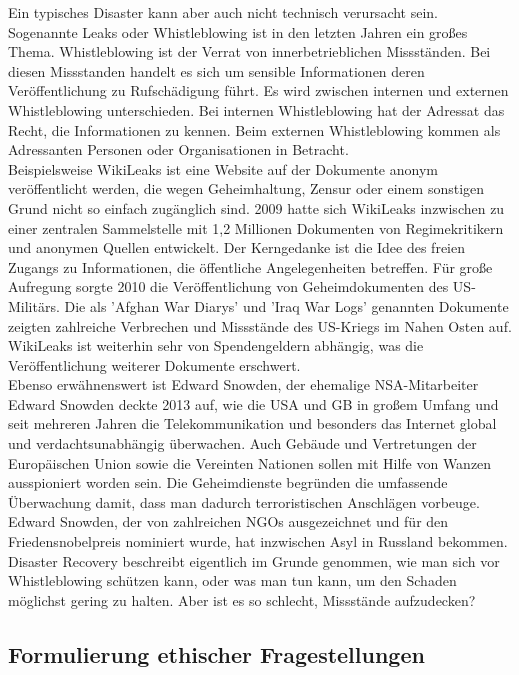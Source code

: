 \documentclass[letterpaper, 12pt]{article}
\let\tempsubsection\subsection
\renewcommand\subsection[1]{\vspace{0cm}\tempsubsection{#1}\vspace{0cm}}
\begin{document}
Ein typisches Disaster kann aber auch nicht technisch verursacht sein. Sogenannte Leaks oder Whistleblowing ist in den letzten Jahren ein großes Thema. Whistleblowing ist der Verrat von innerbetrieblichen Missständen. Bei diesen Missstanden handelt es sich um sensible Informationen deren Veröffentlichung zu Rufschädigung führt. Es wird zwischen internen und externen Whistleblowing unterschieden. Bei internen Whistleblowing hat der Adressat das Recht, die Informationen zu kennen. Beim externen Whistleblowing kommen als Adressanten Personen oder Organisationen in Betracht. \\
Beispielsweise WikiLeaks ist eine Website auf der Dokumente anonym veröffentlicht werden, die wegen Geheimhaltung, Zensur oder einem sonstigen Grund nicht so einfach zugänglich sind. 2009 hatte sich WikiLeaks inzwischen zu einer zentralen Sammelstelle mit 1,2 Millionen Dokumenten von Regimekritikern und anonymen Quellen entwickelt. Der Kerngedanke ist die Idee des freien Zugangs zu Informationen, die öffentliche Angelegenheiten betreffen.
Für große Aufregung sorgte 2010 die Veröffentlichung von Geheimdokumenten des US-Militärs. Die als 'Afghan War Diarys' und 'Iraq War Logs' genannten Dokumente zeigten zahlreiche Verbrechen und Missstände des US-Kriegs im Nahen Osten auf. WikiLeaks ist weiterhin sehr von Spendengeldern abhängig, was die Veröffentlichung weiterer Dokumente erschwert. \\
Ebenso erwähnenswert ist Edward Snowden, der ehemalige NSA-Mitarbeiter Edward Snowden deckte 2013 auf, wie die USA und GB in großem Umfang und seit mehreren Jahren die Telekommunikation und besonders das Internet global und verdachtsunabhängig überwachen. Auch Gebäude und Vertretungen der Europäischen Union sowie die Vereinten Nationen sollen mit Hilfe von Wanzen ausspioniert worden sein. Die Geheimdienste begründen die umfassende Überwachung damit, dass man dadurch terroristischen Anschlägen vorbeuge.
Edward Snowden, der von zahlreichen NGOs ausgezeichnet und für den Friedensnobelpreis nominiert wurde, hat inzwischen Asyl in Russland bekommen. \\
Disaster Recovery beschreibt eigentlich im Grunde genommen, wie man sich vor Whistleblowing schützen kann, oder was man tun kann, um den Schaden möglichst gering zu halten. Aber ist es so schlecht, Missstände aufzudecken? \cite{wb} \clearpage

\subsection{Formulierung ethischer Fragestellungen}
\end{document}
